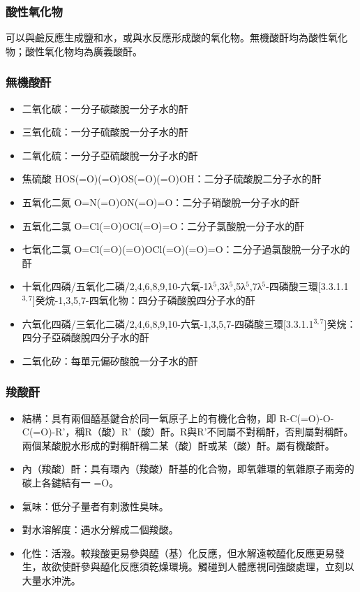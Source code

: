 \documentclass[a4paper,12pt]{report}
\begin{document}
\begin{itemize}
\subsubsection{酸性氧化物}
可以與鹼反應生成鹽和水，或與水反應形成酸的氧化物。無機酸酐均為酸性氧化物；酸性氧化物均為廣義酸酐。
\subsubsection{無機酸酐}
\begin{itemize}
\item 二氧化碳：一分子碳酸脫一分子水的酐
\item 三氧化硫：一分子硫酸脫一分子水的酐
\item 二氧化硫：一分子亞硫酸脫一分子水的酐
\item 焦硫酸 HOS(=O)(=O)OS(=O)(=O)OH：二分子硫酸脫二分子水的酐
\item 五氧化二氮 O=N(=O)ON(=O)=O：二分子硝酸脫一分子水的酐
\item 五氧化二氯 O=Cl(=O)OCl(=O)=O：二分子氯酸脫一分子水的酐
\item 七氧化二氯 O=Cl(=O)(=O)OCl(=O)(=O)=O：二分子過氯酸脫一分子水的酐
\item 十氧化四磷/五氧化二磷/2,4,6,8,9,10-六氧-1λ$^5$,3λ$^5$,5λ$^5$,7λ$^5$-四磷酸三環[3.3.1.1$^{3,7}$]癸烷-1,3,5,7-四氧化物：四分子磷酸脫四分子水的酐
\item 六氧化四磷/三氧化二磷/2,4,6,8,9,10-六氧-1,3,5,7-四磷酸三環[3.3.1.1$^{3,7}$]癸烷：四分子亞磷酸脫四分子水的酐
\item 二氧化矽：每單元偏矽酸脫一分子水的酐
\end{itemize}
\subsubsection{羧酸酐}
\begin{itemize}
\item 結構：具有兩個醯基鍵合於同一氧原子上的有機化合物，即 R-C(=O)-O-C(=O)-R'，稱R（酸）R'（酸）酐。R與R'不同屬不對稱酐，否則屬對稱酐。兩個某酸脫水形成的對稱酐稱二某（酸）酐或某（酸）酐。屬有機酸酐。
\item 內（羧酸）酐：具有環內（羧酸）酐基的化合物，即氧雜環的氧雜原子兩旁的碳上各鍵結有一 =O。
\item 氣味：低分子量者有刺激性臭味。
\item 對水溶解度：遇水分解成二個羧酸。
\item 化性：活潑。較羧酸更易參與醯（基）化反應，但水解遠較醯化反應更易發生，故欲使酐參與醯化反應須乾燥環境。觸碰到人體應視同強酸處理，立刻以大量水沖洗。
\end{itemize}

\end{itemize}
\end{document}
